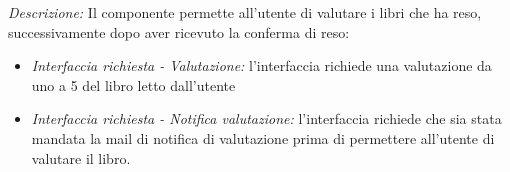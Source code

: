 \documentclass{article}
\begin{document}
\begin{itemize}
    \textit{Descrizione:} Il componente permette all'utente di valutare i libri che ha reso, successivamente dopo aver ricevuto la conferma di reso:
    \begin{itemize}
        \item \textit{Interfaccia richiesta - Valutazione:} l’interfaccia richiede una valutazione da uno a 5 del libro letto dall'utente
        \item \textit{Interfaccia richiesta - Notifica valutazione:} l’interfaccia richiede che sia stata mandata la mail di notifica di valutazione prima di permettere all’utente di valutare il libro.
    \end{itemize}
\end{itemize}
\end{document}
